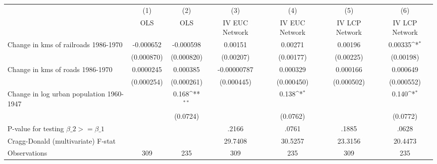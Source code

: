 {
\def\sym#1{\ifmmode^{#1}\else\(^{#1}\)\fi}
\begin{tabular}{l*{6}{c}}
\hline\hline
                &\multicolumn{1}{c}{(1)}&\multicolumn{1}{c}{(2)}&\multicolumn{1}{c}{(3)}&\multicolumn{1}{c}{(4)}&\multicolumn{1}{c}{(5)}&\multicolumn{1}{c}{(6)}\\
                &\multicolumn{1}{c}{OLS}&\multicolumn{1}{c}{OLS}&\multicolumn{1}{c}{IV EUC Network}&\multicolumn{1}{c}{IV EUC Network}&\multicolumn{1}{c}{IV LCP Network}&\multicolumn{1}{c}{IV LCP Network}\\
\hline
Change in kms of railroads 1986-1970&-0.000652         &-0.000598         &  0.00151         &  0.00271         &  0.00196         &  0.00335\sym{*}  \\
                &(0.000870)         &(0.000820)         &(0.00207)         &(0.00177)         &(0.00225)         &(0.00198)         \\
[1em]
Change in kms of roads 1986-1970&0.0000245         & 0.000385         &-0.00000787         & 0.000329         & 0.000166         & 0.000649         \\
                &(0.000254)         &(0.000261)         &(0.000445)         &(0.000450)         &(0.000502)         &(0.000552)         \\
[1em]
Change in log urban population 1960-1947&                  &    0.168\sym{**} &                  &    0.138\sym{*}  &                  &    0.140\sym{*}  \\
                &                  & (0.0724)         &                  & (0.0762)         &                  & (0.0772)         \\
\hline
P-value for testing $\beta\_{2} >= \beta\_{1}$&                  &                  &    .2166         &    .0761         &    .1885         &    .0628         \\
Cragg-Donald (multivariate) F-stat&                  &                  &  29.7408         &  30.5257         &  23.3156         &  20.4473         \\
Observations    &      309         &      235         &      309         &      235         &      309         &      235         \\
\hline\hline
\end{tabular}
}

